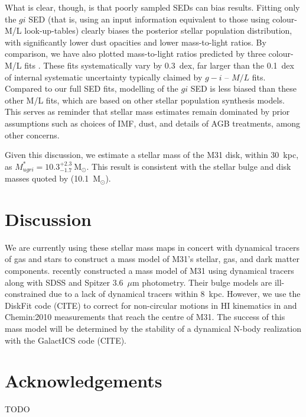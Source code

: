 \documentclass{iau}
\newcommand{\mnras}{MNRAS}       %
\begin{document}
What is clear, though, is that poorly sampled SEDs can bias results.
Fitting only the $gi$ SED (that is, using an input information equivalent to those using colour-M/L look-up-tables) clearly biases the posterior stellar population distribution, with significantly lower dust opacities and lower mass-to-light ratios. 
By comparison, we have also plotted mass-to-light ratios predicted by three colour-M/L fits \citep{Zibetti:2009,Taylor:2011,Into:2013}.
These fits systematically vary by 0.3~dex, far larger than the 0.1~dex of internal systematic uncertainty typically claimed by $g-i$ -- $M/L$ fits. 
Compared to our full SED fits, modelling of the $gi$ SED is less biased than these other M/L fits, which are based on other stellar population synthesis models.
This serves as reminder that stellar mass estimates remain dominated by prior assumptions such as choices of IMF, dust, and details of AGB treatments, among other concerns.

Given this discussion, we estimate a stellar mass of the M31 disk, within $30$~kpc, as $M_{ugri}^{*} = 10.3^{+2.3}_{-1.7}~\mathrm{M}_\odot$.
This result is consistent with the stellar bulge and disk masses quoted by \cite{Tamm:2012} (10.1~$\mathrm{M}_\odot$).

\section{Discussion}

We are currently using these stellar mass maps in concert with dynamical tracers of gas and stars to construct a mass model of M31's stellar, gas, and dark matter components.
\cite{Tamm:2012} recently constructed a mass model of M31 using dynamical tracers along with SDSS and Spitzer 3.6~$\mu$m photometry.
Their bulge models are ill-constrained due to a lack of dynamical tracers within 8~kpc.
However, we use the DiskFit code (CITE) to correct for non-circular motions in HI kinematics in \cite{Saglia:2010} and {Chemin:2010} measurements that reach the centre of M31.
The success of this mass model will be determined by the stability of a dynamical N-body realization with the GalactICS code (CITE).


\section*{Acknowledgements}

\noindent TODO





\end{document}
